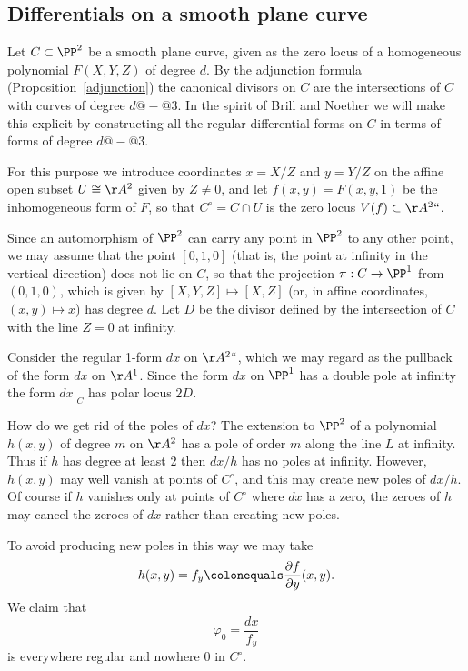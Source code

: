 \subsection{Differentials on a smooth plane curve}\label{canonical series on smooth plane curves}

Let $C \subset \PP^2$  be a smooth plane curve, given as the zero locus of a homogeneous polynomial $F(X,Y,Z)$ of degree $d$. By the
adjunction formula
%
(Proposition~\ref{adjunction}) the canonical  divisors on $C$
are the intersections of $C$ with curves of degree $d@{-}@3$. In the spirit of Brill and Noether we
will make this explicit by constructing all
 the
regular differential forms
%
%
 on $C$ in terms of forms of degree $d@{-}@3$.

For this purpose we introduce coordinates $x = X/Z$ and $y = Y/Z$ on the affine open subset $U \cong \AA^2$ given by $Z \neq 0$, and let $f(x,y) = F(x, y,1)$ be the inhomogeneous form of $F$, so that $C^\circ = C \cap U$ is the zero locus $V(f) \subset  \AA^2` `$.

Since an automorphism of $\PP^2$ can carry any point in $\PP^{2}$ to any other point, we may assume
that
the point $[0,1,0]$ (that is, the point at infinity
in the vertical direction) does not lie on $C$, so that the
 projection  $\pi: C \to \PP^1$ from $(0,1,0)$, which is given by $[X,Y,Z] \mapsto [X,Z]$ (or, in affine coordinates, $(x,y) \mapsto x$)  has degree $d$. Let $D$ be the divisor defined by the intersection of $C$ with the line $Z=0$ at infinity.

Consider the
regular 1-form $dx$ on $\AA^2` `$, which we may regard as the pullback of the form $dx$ on
 $\AA^{1}$.
Since the form $dx$ on $\PP^{1}$ has a
%
double pole
at infinity the form $dx|_{C}$ has polar
locus $2D$.

 \def\Co{{C^{\circ}}}
How do we get rid of the poles of $dx$? The extension to $\PP^2$ of a polynomial $h(x,y)$ of degree $m$ on
$\AA^2$ has a pole of order $m$ along the line $L$ at infinity. Thus if $h$ has degree at least 2 then $dx/h$ has no poles at infinity. However, $h(x,y)$ may well vanish at points of $\Co$, and this may create new poles of $dx/h$. Of course if $h$ vanishes only at  points of $\Co$ where $dx$ has a zero, the zeroes of $h$ may cancel the zeroes of $dx$ rather than creating new poles.

 To avoid producing new poles in this way we may take
 $$
 h(x,y) = f_{y} \colonequals \frac{\partial f}{\partial y}(x,y).
 $$
 We claim that
 $$
\varphi_0 = \frac{dx}{f_{y}}
$$
is everywhere regular and nowhere 0 in $C^\circ$.

